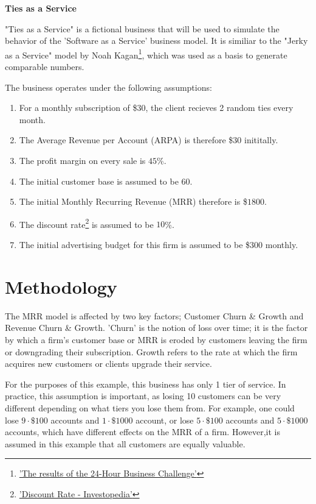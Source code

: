 \documentclass[11pt]{article}
\begin{document}
\begin{center}
\textbf{Ties as a Service}
\end{center}


"Ties as a Service" is a fictional business that will be used to simulate the behavior of the 'Software as a Service' business model. It is similiar to the "Jerky as a Service" model by Noah Kagan\footnote{\href{http://www.appsumo.com/sumo-jerky/}{'The results of the 24-Hour Business Challenge'}}, which was used as a basis to generate comparable numbers. 

The business operates under the following assumptions:

\begin{enumerate}
  \item For a monthly subscription of \$$30$, the client recieves 2 random ties every month. 
  \item The Average Revenue per Account (ARPA) is therefore \$$30$ inititally.
  \item The profit margin on every sale is $45$\%.
  \item The initial customer base is assumed to be $60$.
  \item The initial Monthly Recurring Revenue (MRR) therefore is \$$1800$.
  \item The discount rate\footnote{\href{http://www.investopedia.com/terms/d/discountrate.asp}{'Discount Rate - Investopedia'}} is assumed to be $10$\%.
  \item The initial advertising budget for this firm is assumed to be \$$300$ monthly.
\end{enumerate}

\newpage

\section*{Methodology}

The MRR model is affected by two key factors; Customer Churn \& Growth and Revenue Churn \& Growth. 'Churn' is the notion of loss over time; it is the factor by which a firm's customer base or MRR is eroded by customers leaving the firm or downgrading their subscription. Growth refers to the rate at which the firm acquires new customers or clients upgrade their service. 

For the purposes of this example, this business has only 1 tier of service. In practice, this assumption is important, as losing 10 customers can be very different depending on what tiers you lose them from. For example, one could lose $9 \cdot \$100$ accounts and $1 \cdot \$1000$ account, or lose $5 \cdot \$100$ accounts and $5 \cdot \$1000$ accounts, which have different effects on the MRR of a firm. However,it is assumed in this example that all customers are equally valuable. 
\end{document}
